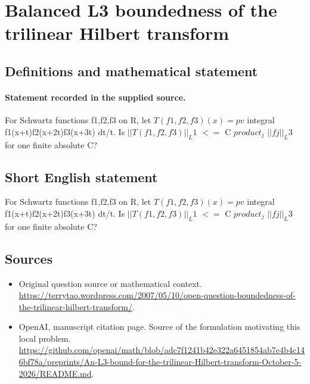 \documentclass[11pt]{article}
\begin{document}
\section*{Balanced L3 boundedness of the trilinear Hilbert transform}\label{30007440}
\subsection{Definitions and mathematical statement}
\paragraph{Statement recorded in the supplied source.}
For Schwartz functions f1,f2,f3 on R, let $T(f1,f2,f3)(x)=pv$ integral f1(x+t)f2(x+2t)f3(x+3t) dt/t. Is $||T(f1,f2,f3)||_L1$ $<=$ C $product_j$ $||fj||_L3$ for one finite absolute C?
\subsection{Short English statement}
For Schwartz functions f1,f2,f3 on R, let $T(f1,f2,f3)(x)=pv$ integral f1(x+t)f2(x+2t)f3(x+3t) dt/t. Is $||T(f1,f2,f3)||_L1$ $<=$ C $product_j$ $||fj||_L3$ for one finite absolute C?
\subsection{Sources}
\begin{itemize}
\item[S1] Original question source or mathematical context.
\url{https://terrytao.wordpress.com/2007/05/10/open-question-boundedness-of-the-trilinear-hilbert-transform/}.
\item[S2] OpenAI, manuscript citation page. Source of the formulation motivating this local problem.
\url{https://github.com/openai/math/blob/adc7f1241b42e322a6451854ab7e4b4c146bf78a/preprints/An-L3-bound-for-the-trilinear-Hilbert-transform-October-5-2026/README.md}.
\end{itemize}
\end{document}
